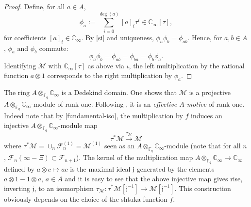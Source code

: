 \documentclass[11pt]{amsart}
\numberwithin{equation}{section}
\newcommand{\FF}{\mathbb{F}}
\newcommand{\CC}{\mathbb{C}}
\begin{document}
\begin{proof}
Define, for all $a\in A$,
\begin{equation}\label{drinfeld-module}
\phi_a:=\sum_{i=0}^{\deg(a)}[a]_i\tau^i\in\CC_\infty[\tau],
\end{equation} for coefficients $[a]_i\in\CC_\infty$. By \eqref{si} and uniqueness,
$\phi_a\phi_b=\phi_{ab}$.
Hence, for $a,b\in A$, $\phi_a$ and $\phi_b$ commute: $$\phi_{a}\phi_b=\phi_{ab}=\phi_{ba}=\phi_b\phi_a.$$
Identifying $\mathcal{M}$ with $\CC_\infty[\tau]$ as above via $\iota$, the left multiplication by the rational function
$a\otimes1$ corresponds to the right multiplication by $\phi_a$. 
\end{proof}

The ring $A\otimes_{\FF_q}\CC_\infty$ is a Dedekind domain. One shows that $\mathcal{M}$ is a projective $A\otimes_{\FF_q}\CC_\infty$-module of rank one. Following \cite[Definition 2.3.1]{HAR&JUS}, it is an {\em effective $A$-motive} of rank one. 
Indeed note that by \eqref{fundamental-iso}, the multiplication by $f$ induces an injective $A\otimes_{\FF_q}\CC_\infty$-module map
$$\tau^*\mathcal{M}\xrightarrow{\tau_\mathcal{M}}\mathcal{M}$$
where $\tau^*\mathcal{M}=\cup_n\mathcal{F}_{n}^{(1)}=\mathcal{M}^{(1)}$ seen as an $A\otimes_{\FF_q}\CC_\infty$-module (note that for all $n$, $\mathcal{F}_n(\infty-\Xi)\subset\mathcal{F}_{n+1}$). The kernel of the multiplication map $A\otimes_{\FF_q}\CC_\infty\rightarrow\CC_\infty$ defined by $a\otimes c\mapsto ac$ is the maximal ideal $\mathfrak{j}$ generated by the 
elements $a\otimes1-1\otimes a$, $a\in A$ and it is easy to see that the above injective map gives rise, inverting $\mathfrak{j}$, to an isomorphism $\tau_\mathcal{M}:\tau^*\mathcal{M}[\mathfrak{j}^{-1}]\rightarrow\mathcal{M}[\mathfrak{j}^{-1}]$.
This construction obviously depends on the choice of the shtuka function $f$. 
\end{document}
